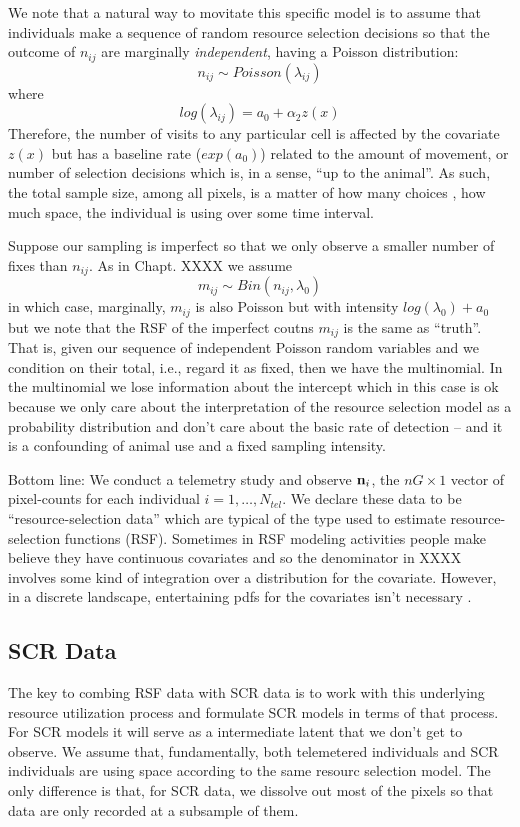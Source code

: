 We note that a natural way to movitate this specific model is to
assume that individuals make a sequence of random resource selection
decisions so that the outcome of $n_{ij}$ are marginally {\it
  independent}, having a Poisson distribution:
\[
 n_{ij} \sim Poisson( \lambda_{ij})
\]
where
\[
 log(\lambda_{ij}) = a_{0}  + \alpha_{2} z(x)
\]
Therefore, the number of visits to any particular cell is affected by
the covariate $z(x)$ but has a baseline rate ($exp(a_{0})$) related to the amount
of movement, or number of selection decisions which is,
in a sense,
``up to the animal''. As such, the total sample size, among all
pixels, is a matter of how many choices , how much  space, the
individual is using over some time interval.

Suppose our sampling is imperfect so that we only observe a smaller
number of fixes than $n_{ij}$. As in Chapt. XXXX we assume
\[
 m_{ij} \sim Bin(n_{ij}, \lambda_{0})
\]
in which case, marginally, $m_{ij}$ is also Poisson but with intensity
$log(\lambda_{0}) + a_{0}$ but we note that the RSF of the imperfect
coutns $m_{ij}$ is the same as ``truth''.
That is, 
given our sequence of 
independent Poisson random variables and we condition on their total,
i.e., regard it as fixed, then we have the multinomial. In the
multinomial we lose information about the intercept which in this case
is ok because we only care about the interpretation of the resource
selection model as a probability distribution and don't care about the
basic rate of detection -- and it is a confounding of animal use and a
fixed sampling intensity. 

Bottom line: 
We conduct a telemetry study and observe ${\bf n}_{i}$, the $nG \times
1$ vector of pixel-counts for each individual $i=1,\ldots,N_{tel}$.
We declare these data to be ``resource-selection data'' which are
typical of the type used to estimate resource-selection functions
(RSF). Sometimes in RSF modeling activities people make believe they
have  continuous covariates and so the denominator in XXXX involves
some kind of integration over a distribution for the
covariate. However, in a discrete landscape, entertaining pdfs for the
covariates isn't necessary \citep{royle_etal:2012mee}. 





\subsection{SCR Data}

The key to combing RSF data with SCR data is to 
work with this underlying resource utilization process and formulate SCR
models in terms of that process. For SCR models it will serve as a
intermediate latent that we don't get to observe. We assume that,
fundamentally, both telemetered individuals and SCR individuals are
using space according to the same resourc selection model. The only
difference is that, for SCR data, we dissolve out most of the pixels
so that data are only recorded at a subsample of them.  

